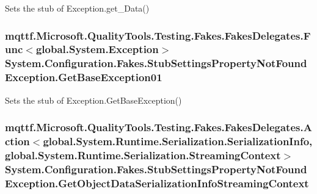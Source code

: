 Sets the stub of Exception.\-get\-\_\-\-Data()

\hypertarget{class_system_1_1_configuration_1_1_fakes_1_1_stub_settings_property_not_found_exception_a61467768f13afa4604bc7490b0a9f93c}{
\subsubsection[{Get\-Base\-Exception01}]{\setlength{\rightskip}{0pt plus 5cm}mqttf.\-Microsoft.\-Quality\-Tools.\-Testing.\-Fakes.\-Fakes\-Delegates.\-Func$<$global.\-System.\-Exception$>$ System.\-Configuration.\-Fakes.\-Stub\-Settings\-Property\-Not\-Found\-Exception.\-Get\-Base\-Exception01}}\label{class_system_1_1_configuration_1_1_fakes_1_1_stub_settings_property_not_found_exception_a61467768f13afa4604bc7490b0a9f93c}


Sets the stub of Exception.\-Get\-Base\-Exception()

\hypertarget{class_system_1_1_configuration_1_1_fakes_1_1_stub_settings_property_not_found_exception_aabfccd783e3b48b13f9c8bebb4d487f1}{
\subsubsection[{Get\-Object\-Data\-Serialization\-Info\-Streaming\-Context}]{\setlength{\rightskip}{0pt plus 5cm}mqttf.\-Microsoft.\-Quality\-Tools.\-Testing.\-Fakes.\-Fakes\-Delegates.\-Action$<$global.\-System.\-Runtime.\-Serialization.\-Serialization\-Info, global.\-System.\-Runtime.\-Serialization.\-Streaming\-Context$>$ System.\-Configuration.\-Fakes.\-Stub\-Settings\-Property\-Not\-Found\-Exception.\-Get\-Object\-Data\-Serialization\-Info\-Streaming\-Context}}\label{class_system_1_1_configuration_1_1_fakes_1_1_stub_settings_property_not_found_exception_aabfccd783e3b48b13f9c8bebb4d487f1}


